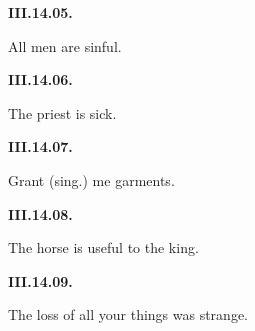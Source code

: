 \par\begin{minipage}{\linewidth}\raggedright
\textbf{III.14.05.}

All men are sinful.

\end{minipage}\par\addvspace{4pt}

\par\begin{minipage}{\linewidth}\raggedright
\textbf{III.14.06.}

The priest is sick.

\end{minipage}\par\addvspace{4pt}

\par\begin{minipage}{\linewidth}\raggedright
\textbf{III.14.07.}

Grant (sing.) me garments.

\end{minipage}\par\addvspace{4pt}

\par\begin{minipage}{\linewidth}\raggedright
\textbf{III.14.08.}

The horse is useful to the king.

\end{minipage}\par\addvspace{4pt}

\par\begin{minipage}{\linewidth}\raggedright
\textbf{III.14.09.}

The loss of all your things was strange.

\end{minipage}\par\addvspace{4pt}

